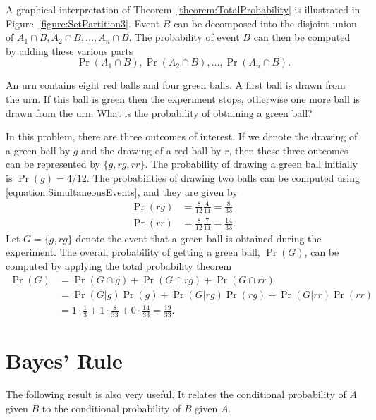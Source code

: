 A graphical interpretation of Theorem~\ref{theorem:TotalProbability} is illustrated in Figure~\ref{figure:SetPartition3}.
Event $B$ can be decomposed into the disjoint union of $A_1 \cap B, A_2 \cap B, \ldots, A_n \cap B$.
The probability of event $B$ can then be computed by adding these various parts
\begin{equation*}
\Pr (A_1 \cap B), \Pr (A_2 \cap B), \ldots, \Pr (A_n \cap B) .
\end{equation*}

\begin{example}
An urn contains eight red balls and four green balls.
A first ball is drawn from the urn.
If this ball is green then the experiment stops, otherwise one more ball is drawn from the urn.
What is the probability of obtaining a green ball?

In this problem, there are three outcomes of interest.
If we denote the drawing of a green ball by $g$ and the drawing of a red ball by $r$, then these three outcomes can be represented by $\{ g, rg, rr \}$.
The probability of drawing a green ball initially is $\Pr (g) = 4/12$.
The probabilities of drawing two balls can be computed using \eqref{equation:SimultaneousEvents}, and they are given by
\begin{align*}
\Pr (rg) &= \frac{8}{12} \frac{4}{11} = \frac{8}{33} \\
\Pr (rr) &= \frac{8}{12} \frac{7}{11} = \frac{14}{33} .
\end{align*}
Let $G = \{ g, rg \}$ denote the event that a green ball is obtained during the experiment.
The overall probability of getting a green ball, $\Pr (G)$, can be computed by applying the total probability theorem
\begin{equation*}
\begin{split}
\Pr (G) &= \Pr (G \cap g) + \Pr (G \cap rg) + \Pr (G \cap rr) \\
&= \Pr (G|g) \Pr(g) + \Pr (G|rg) \Pr(rg) + \Pr (G|rr) \Pr(rr) \\
&= 1 \cdot \frac{1}{3} + 1 \cdot \frac{8}{33} + 0 \cdot \frac{14}{33}
= \frac{19}{33} .
\end{split}
\end{equation*}
\end{example}


\section{Bayes' Rule}

The following result is also very useful.
It relates the conditional probability of $A$ given $B$ to the conditional probability of $B$ given $A$.

